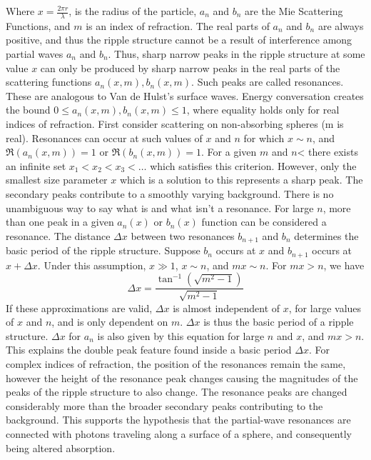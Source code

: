 \documentclass{article}
\theoremstyle{mystyle}
\begin{document}
\noindent Where $x = \frac{2\pi r}{\lambda}$, is the radius of the particle, $a_n$ and $b_n$ are the Mie Scattering Functions, and $m$ is an index of refraction. The real parts of $a_n$ and $b_n$ are always positive, and thus the ripple structure cannot be a result of interference among partial waves $a_n$ and $b_n$. Thus, sharp narrow peaks in the ripple structure at some value $x$ can only be produced by sharp narrow peaks in the real parts of the scattering functions $a_{n}(x,m), b_{n}(x,m)$. Such peaks are called resonances. These are analogous to Van de Hulst's surface waves. Energy conversation creates the bound $0 \leq a_{n}(x,m), b_{n}(x,m) \leq 1$, where equality holds only for real indices of refraction. First consider scattering on non-absorbing spheres (m is real). Resonances can occur at such values of $x$ and $n$ for which $x \sim n$, and $\Re(a_{n}(x,m)) = 1$ or $\Re(b_{n}(x,m)) = 1$. For a given $m$ and $n$< there exists an infinite set $x_1< x_2 <x_3 <\hdots$ which satisfies this criterion. However, only the smallest size parameter $x$ which is a solution to this represents a sharp peak. The secondary peaks contribute to a smoothly varying background. There is no unambiguous way to say what is and what isn't a resonance. For large $n$, more than one peak in a given $a_{n}(x)$ or $b_{n}(x)$ function can be considered a resonance. The distance $\Delta x$ between two resonances $b_{n+1}$ and $b_{n}$ determines the basic period of the ripple structure. Suppose $b_n$ occurs at $x$ and $b_{n+1}$ occurs at $x+\Delta x$. Under this assumption, $x\gg 1$, $x\sim n$, and $mx\sim n$. For $mx>n$, we have
\begin{equation}
\Delta x =\frac{\tan^{-1}(\sqrt{m^2-1})}{\sqrt{m^2-1}}
\end{equation}
\noindent If these approximations are valid, $\Delta x$ is almost independent of $x$, for large values of $x$ and $n$, and is only dependent on $m$. $\Delta x$ is thus the basic period of a ripple structure. $\Delta x$ for $a_{n}$ is also given by this equation for large $n$ and $x$, and $mx>n$. This explains the double peak feature found inside a basic period $\Delta x$. For complex indices of refraction, the position of the resonances remain the same, however the height of the resonance peak changes causing the magnitudes of the peaks of the ripple structure to also change. The resonance peaks are changed considerably more than the broader secondary peaks contributing to the background. This supports the hypothesis that the partial-wave resonances are connected with photons traveling along a surface of a sphere, and consequently being altered absorption. 
\end{document}
